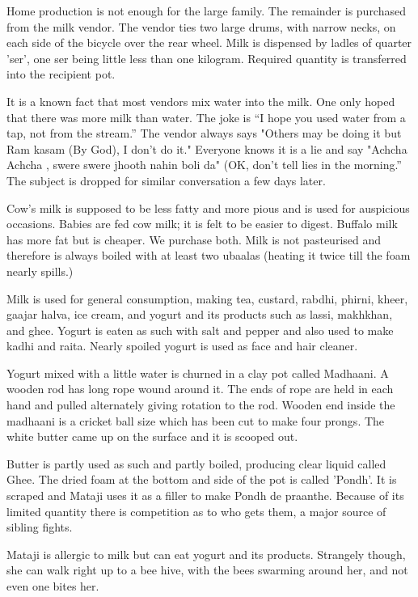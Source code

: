 Home production is not enough for the large family. The remainder is
purchased from the milk vendor. The vendor ties two large drums, with
narrow necks, on each side of the bicycle over the rear wheel. Milk is
dispensed by ladles of quarter 'ser', one ser being little less than one
kilogram. Required quantity is transferred into the recipient pot. 

It is a known fact that most vendors mix water into the milk. One only
hoped that there was more milk than water. The joke is “I hope you used
water from a tap, not from the stream.” The vendor always says "Others may
be doing it but Ram kasam (By God), I don't do it." Everyone knows it is
a lie and say "Achcha Achcha , swere swere jhooth nahin boli da" (OK,
don't tell lies in the morning.” The subject is dropped for similar
conversation a few days later. 

Cow's milk is supposed to be less fatty and more pious and is used for
auspicious occasions. Babies are fed cow milk; it is felt to be easier to
digest. Buffalo milk has more fat but is cheaper. We purchase both. Milk
is not pasteurised and therefore is always boiled with at least two
ubaalas (heating it twice till the foam nearly spills.)

Milk is used for general consumption, making tea, custard, rabdhi, phirni,
kheer, gaajar halva, ice cream, and yogurt and its products such as lassi,
makhkhan, and ghee. Yogurt is eaten as such with salt and pepper and also
used to make kadhi and raita. Nearly spoiled yogurt is used as face and
hair cleaner.

Yogurt mixed with a little water is churned in a clay pot called Madhaani.
A wooden rod has long rope wound around it. The ends of rope are held in
each hand and pulled alternately giving rotation to the rod. Wooden end
inside the madhaani is a cricket ball size which has been cut to make four
prongs. The white butter came up on the surface and it is scooped out. 

Butter is partly used as such and partly boiled, producing clear liquid
called Ghee. The dried foam at the bottom and side of the pot is called
'Pondh'. It is scraped and Mataji uses it as a filler to make Pondh de
praanthe. Because of its limited quantity there is competition as to who
gets them, a major source of sibling fights. 

Mataji is allergic to milk but can eat yogurt and its products. Strangely
though, she can walk right up to a bee hive, with the bees swarming around
her, and not even one bites her. 

